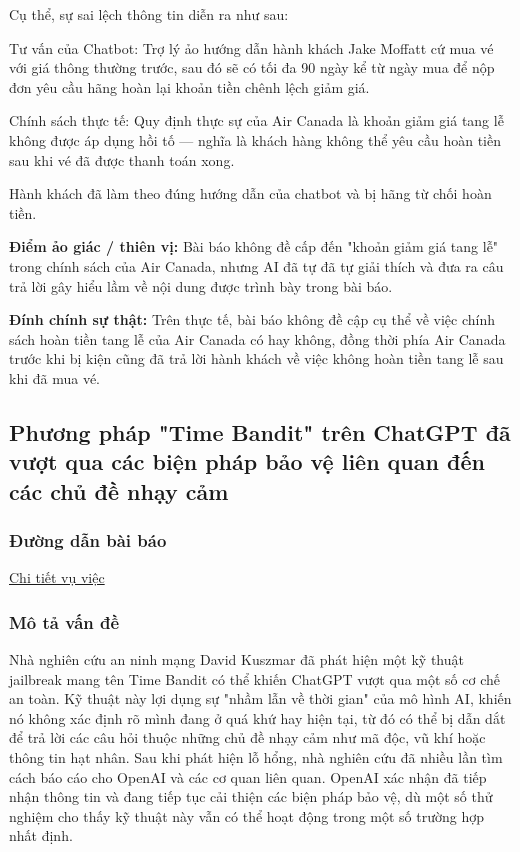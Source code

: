 Cụ thể, sự sai lệch thông tin diễn ra như sau:

Tư vấn của Chatbot: Trợ lý ảo hướng dẫn hành khách Jake Moffatt cứ mua vé với giá thông thường trước, sau đó sẽ có tối đa 90 ngày kể từ ngày mua để nộp đơn yêu cầu hãng hoàn lại khoản tiền chênh lệch giảm giá.

Chính sách thực tế: Quy định thực sự của Air Canada là khoản giảm giá tang lễ không được áp dụng hồi tố — nghĩa là khách hàng không thể yêu cầu hoàn tiền sau khi vé đã được thanh toán xong.

Hành khách đã làm theo đúng hướng dẫn của chatbot và bị hãng từ chối hoàn tiền.

\textbf{Điểm ảo giác / thiên vị:} 
Bài báo không đề cấp đến "khoản giảm giá tang lễ" trong chính sách của Air Canada, nhưng AI đã tự đã tự giải thích và đưa ra câu trả lời gây hiểu lầm về nội dung được trình bày trong bài báo.

\textbf{Đính chính sự thật:} 
Trên thực tế, bài báo không đề cập cụ thể về việc chính sách hoàn tiền tang lễ của Air Canada có hay không, đồng thời phía Air Canada trước khi bị kiện cũng đã trả lời hành khách về việc không hoàn tiền tang lễ sau khi đã mua vé.

\subsection{Phương pháp "Time Bandit" trên ChatGPT đã vượt qua các biện pháp bảo vệ liên quan đến các chủ đề nhạy cảm}

\subsubsection{Đường dẫn bài báo}
\href{https://www.bleepingcomputer.com/news/security/time-bandit-chatgpt-jailbreak-bypasses-safeguards-on-sensitive-topics/}{Chi tiết vụ việc}

\subsubsection{Mô tả vấn đề}
Nhà nghiên cứu an ninh mạng David Kuszmar đã phát hiện một kỹ thuật jailbreak mang tên Time Bandit có thể khiến ChatGPT vượt qua một số cơ chế an toàn. Kỹ thuật này lợi dụng sự "nhầm lẫn về thời gian" của mô hình AI, khiến nó không xác định rõ mình đang ở quá khứ hay hiện tại, từ đó có thể bị dẫn dắt để trả lời các câu hỏi thuộc những chủ đề nhạy cảm như mã độc, vũ khí hoặc thông tin hạt nhân. Sau khi phát hiện lỗ hổng, nhà nghiên cứu đã nhiều lần tìm cách báo cáo cho OpenAI và các cơ quan liên quan. OpenAI xác nhận đã tiếp nhận thông tin và đang tiếp tục cải thiện các biện pháp bảo vệ, dù một số thử nghiệm cho thấy kỹ thuật này vẫn có thể hoạt động trong một số trường hợp nhất định.

